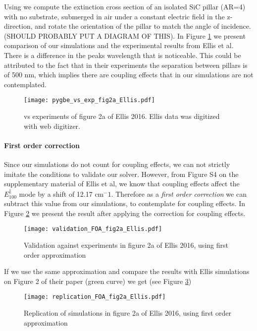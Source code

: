 Using \pygbe we compute the extinction cross section of an isolated SiC pillar (AR=4)
with no substrate, submerged in air under a constant electric field in the z-direction, 
and rotate the orientation of the pillar to match the angle of incidence. 
(SHOULD PROBABLY PUT A DIAGRAM OF THIS). In Figure \ref{fig:pygbe_vs_exp_2a} we present 
comparison of our simulations and the experimental results from Ellis et al. There is a 
difference in the peaks wavelength that is noticeable. This could be attributed to the
fact that in their experiments the separation between pillars is of 500 nm, which implies
there are coupling effects that in our simulations are not contemplated.  

\begin{figure}
    \centering
    \texttt{[image: pygbe\_vs\_exp\_fig2a\_Ellis.pdf]} 
    \caption{\pygbe vs experiments of figure 2a of Ellis 2016. Ellis data 
    was digitized with web digitizer.}
    \label{fig:pygbe_vs_exp_2a}
 \end{figure}

\paragraph{First order correction}

Since our simulations do not count for coupling effects, we can not strictly imitate 
the conditions to validate our solver. However, from Figure S4 on the supplementary 
material of Ellis et al, we know that coupling effects affect the $E^{\parallel}_{100}$ 
mode by a shift of 12.17 cm$^-1$. Therefore as a \textit{first order correction} we can 
subtract this value from our simulations, to contemplate for coupling effects. In Figure 
\ref{fig:val_2a} we present the result after applying the correction for coupling effects. 

\begin{figure}
    \centering
    \texttt{[image: validation\_FOA\_fig2a\_Ellis.pdf]} 
    \caption{Validation against experiments in figure 2a of Ellis 2016, using first order approximation}
    \label{fig:val_2a}
 \end{figure}

If we use the same approximation and compare the results with Ellis simulations on
Figure 2 of their paper (green curve) we get (see Figure \ref{fig:rep_2a})

\begin{figure}
    \centering
    \texttt{[image: replication\_FOA\_fig2a\_Ellis.pdf]} 
    \caption{Replication of simulations in figure 2a of Ellis 2016, using first
     order approximation}
    \label{fig:rep_2a}
 \end{figure}